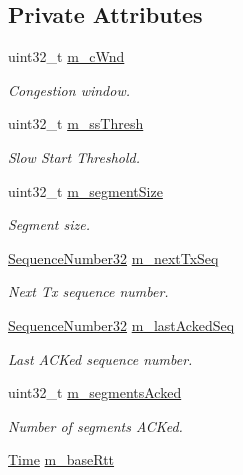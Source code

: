 \subsection*{Private Attributes}
\begin{DoxyCompactItemize}
\item 
uint32\+\_\+t \hyperlink{classTcpYeahIncrementTest_a3661dc763cb1315b447146422578f251}{m\+\_\+c\+Wnd}
\begin{DoxyCompactList}\small\item\em Congestion window. \end{DoxyCompactList}\item 
uint32\+\_\+t \hyperlink{classTcpYeahIncrementTest_a8e3638319f857c50fceeb89c2c6cdabf}{m\+\_\+ss\+Thresh}
\begin{DoxyCompactList}\small\item\em Slow Start Threshold. \end{DoxyCompactList}\item 
uint32\+\_\+t \hyperlink{classTcpYeahIncrementTest_a6b999589e0dd543d73c2a47f0a1dcaf7}{m\+\_\+segment\+Size}
\begin{DoxyCompactList}\small\item\em Segment size. \end{DoxyCompactList}\item 
\hyperlink{group__network_gacb2070e4e98d2d5135c9bede58f07a03}{Sequence\+Number32} \hyperlink{classTcpYeahIncrementTest_a836b1008465881036eb4f1f15e16b72a}{m\+\_\+next\+Tx\+Seq}
\begin{DoxyCompactList}\small\item\em Next Tx sequence number. \end{DoxyCompactList}\item 
\hyperlink{group__network_gacb2070e4e98d2d5135c9bede58f07a03}{Sequence\+Number32} \hyperlink{classTcpYeahIncrementTest_a7b14dd335b9a584c3f4379e5c0a795e4}{m\+\_\+last\+Acked\+Seq}
\begin{DoxyCompactList}\small\item\em Last A\+C\+Ked sequence number. \end{DoxyCompactList}\item 
uint32\+\_\+t \hyperlink{classTcpYeahIncrementTest_a1e5cfd14d9a88d4dcdfb8afcc26fa107}{m\+\_\+segments\+Acked}
\begin{DoxyCompactList}\small\item\em Number of segments A\+C\+Ked. \end{DoxyCompactList}\item 
\hyperlink{classns3_1_1Time}{Time} \hyperlink{classTcpYeahIncrementTest_a5fba73c69f81dc327c87218ba1bff4b6}{m\+\_\+base\+Rtt}

\end{DoxyCompactItemize}

